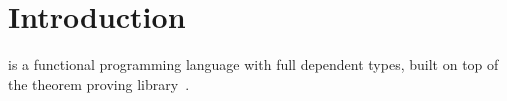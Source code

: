 \section{Introduction}

\Idris{} is a functional programming language with full dependent
types, built on top of the \Ivor{} theorem proving library~\cite{ivor}.

